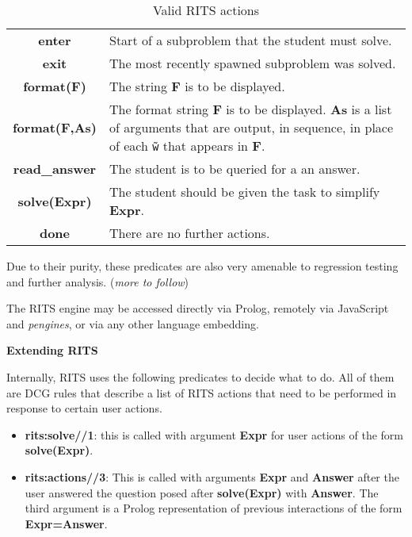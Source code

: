 \documentclass[a4paper,11pt]{article}
\begin{document}
\begin{table}[ht]
  \centering
  \begin{tabular}{cp{7cm}}
    \hline
    \textbf{enter} & Start of a subproblem that the student must solve.\\
    \textbf{exit} & The most recently spawned subproblem was solved.\\
    \textbf{format(F)} & The string \textbf{F} is to be displayed.\\
    \textbf{format(F,As)} & The format string \textbf{F} is to be displayed. \textbf{As} is a list of arguments that are output, in sequence, in place of each \texttt{\~ w} that appears in \textbf{F}.\\
    \textbf{read\_answer} & The student is to be queried for a an answer.\\
    \textbf{solve(Expr)} & The student should be given the task to simplify \textbf{Expr}.\\
    \textbf{done} & There are no further actions.\\
    \hline
  \end{tabular}
\caption{Valid RITS actions}
  \label{tab:ritsactions}
\end{table}


\vspace{0.7cm}

Due to their purity, these predicates are also very amenable to
regression testing and further analysis. (\textit{more to follow})

\vspace{0.7cm}

The RITS engine may be accessed directly via Prolog, remotely via
JavaScript and \textit{pengines}, or via any other language embedding.

\bigskip
\begin{center}
  \large\textbf{Extending RITS}
\end{center}

\medskip
\noindent Internally, RITS uses the following predicates to decide
what to do. All of them are DCG rules that describe a list of RITS
actions that need to be performed in response to certain user actions.

\begin{itemize}
\item \textbf{rits:solve//1}: this is called with argument \textbf{Expr}
  for user actions of the form \textbf{solve(Expr)}.

\item \textbf{rits:actions//3}: This is called with arguments \textbf{Expr}
  and \textbf{Answer} after the user answered the question posed after
  \textbf{solve(Expr)} with \textbf{Answer}. The third argument is a
  Prolog representation of previous interactions of the form
  \textbf{Expr=Answer}.

\end{itemize}
\end{document}

